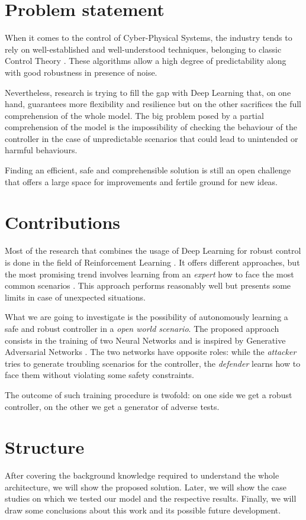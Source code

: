 \section{Problem statement}
When it comes to the control of Cyber-Physical Systems, the industry tends to rely on well-established and well-understood techniques, belonging to classic Control Theory \cite{pidrulez}.
These algorithms allow a high degree of predictability along with good robustness in presence of noise.

Nevertheless, research is trying to fill the gap with Deep Learning \cite{deepqlearning} that, on one hand, guarantees more flexibility and resilience but on the other sacrifices the full comprehension of the whole model.
The big problem posed by a partial comprehension of the model is the impossibility of checking the behaviour of the controller in the case of unpredictable scenarios that could lead to unintended or harmful behaviours.

Finding an efficient, safe and comprehensible solution is still an open challenge that offers a large space for improvements and fertile ground for new ideas.

\section{Contributions}
Most of the research that combines the usage of Deep Learning for robust control is done in the field of Reinforcement Learning \cite{brief_rl}.
It offers different approaches, but the most promising trend involves learning from an \textit{expert} how to face the most common scenarios \cite{inverserl}.
This approach performs reasonably well but presents some limits in case of unexpected situations.

What we are going to investigate is the possibility of autonomously learning a safe and robust controller in a \textit{open world scenario}.
The proposed approach consists in the training of two Neural Networks and is inspired by Generative Adversarial Networks \cite{gan_2014}. The two networks have opposite roles: while the \textit{attacker} tries to generate troubling scenarios for the controller, the \textit{defender} learns how to face them without violating some safety constraints.

The outcome of such training procedure is twofold: on one side we get a robust controller, on the other we get a generator of adverse tests.


\section{Structure}
After covering the background knowledge required to understand the whole architecture, we will show the proposed solution.
Later, we will show the case studies on which we tested our model and the respective results.
Finally, we will draw some conclusions about this work and its possible future development.